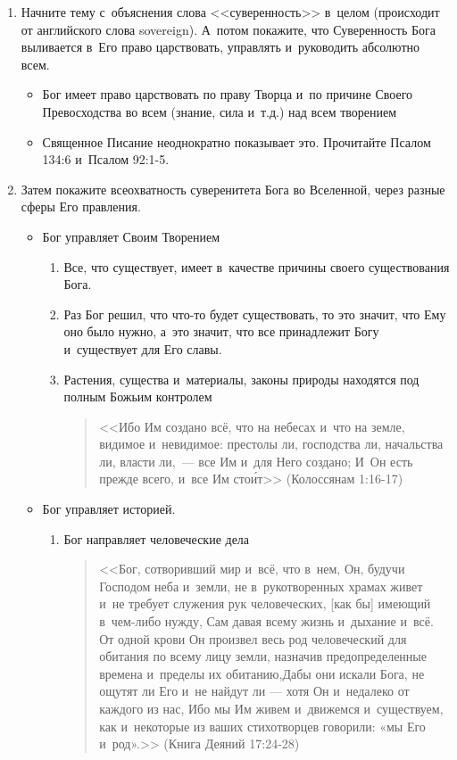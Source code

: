 \documentclass[a4paper,12pt]{article}
\begin{document}
\begin{enumerate}

    \item Начните тему с~объяснения слова <<суверенность>> в~целом (происходит от английского слова sovereign). А~потом покажите, что Суверенность Бога выливается в~Его право царствовать, управлять и~руководить абсолютно всем.
    \begin{itemize}
        \item Бог имеет право царствовать по праву Творца и~по причине Своего Превосходства во всем (знание, сила и~т.д.) над всем творением
        \item Священное Писание неоднократно показывает это. Прочитайте Псалом 134:6 и~Псалом 92:1-5.
    \end{itemize}

    \item Затем покажите всеохватность суверенитета Бога во Вселенной, через разные сферы Его правления.

    \begin{itemize}
    \item Бог управляет Своим Творением
    \begin{enumerate}
        \item Все, что существует, имеет в~качестве причины своего существования Бога.
        \item Раз Бог решил, что что-то будет существовать, то это значит, что Ему оно было нужно, а~это значит, что все принадлежит Богу и~существует для Его славы. 
        \item Растения, существа и~материалы, законы природы находятся под полным Божьим контролем
        \begin{quote}
        <<Ибо Им создано всё, что на небесах и~что на земле, видимое и~невидимое: престолы ли, господства ли, начальства ли, власти ли,~--- все Им и~для Него создано; И~Он есть прежде всего, и~все Им сто\'{и}т>> (Колоссянам 1:16-17)
        \end{quote} 
    \end{enumerate}
    \item Бог управляет историей.
    \begin{enumerate}
        \item Бог направляет человеческие дела 
        \begin{quote}
        <<Бог, сотворивший мир и~всё, что в~нем, Он, будучи Господом неба и~земли, не в~рукотворенных храмах живет и~не требует служения рук человеческих, [как бы] имеющий в~чем-либо нужду, Сам давая всему жизнь и~дыхание и~всё. От одной крови Он произвел весь род человеческий для обитания по всему лицу земли, назначив предопределенные времена и~пределы их обитанию,Дабы они искали Бога, не ощутят ли Его и~не найдут ли — хотя Он и~недалеко от каждого из нас, Ибо мы Им живем и~движемся и~существуем, как и~некоторые из ваших стихотворцев говорили: «мы Его и~род».>> (Книга Деяний 17:24-28)
        \end{quote}


\end{enumerate}
\end{itemize}
\end{enumerate}
\end{document}
